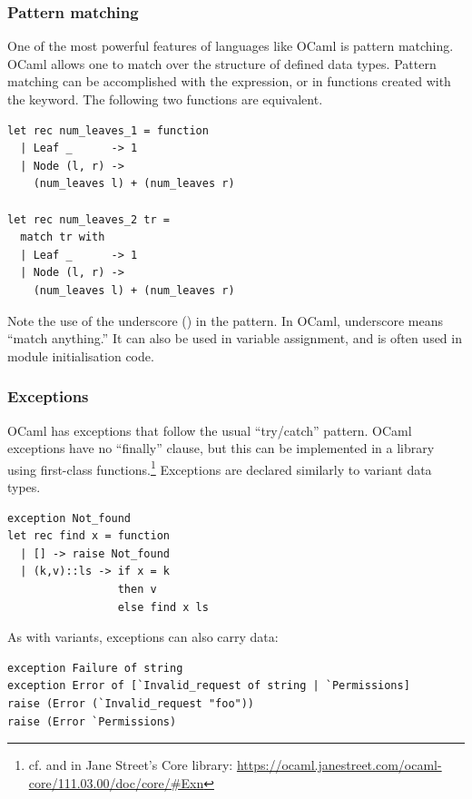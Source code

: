 \subsubsection{Pattern matching}

One of the most powerful features of languages like OCaml is pattern
matching. OCaml allows one to match over the structure of defined data
types. Pattern matching can be accomplished with the
expression, or in functions created with the 
keyword. The following two functions are equivalent.

\begin{lstlisting}
let rec num_leaves_1 = function
  | Leaf _      -> 1
  | Node (l, r) ->
    (num_leaves l) + (num_leaves r)

let rec num_leaves_2 tr =
  match tr with
  | Leaf _      -> 1
  | Node (l, r) ->
    (num_leaves l) + (num_leaves r)
\end{lstlisting}

Note the use of the underscore (\code{_}) in the 
pattern. In OCaml, underscore means ``match anything.'' It can also be
used in variable assignment, and is often used in module
initialisation code.

\subsubsection{Exceptions}

OCaml has exceptions that follow the usual ``try/catch''
pattern. OCaml exceptions have no ``finally'' clause, but this can be
implemented in a library using first-class
functions.\footnote{cf.  and  in Jane
  Street's Core library:
  \url{https://ocaml.janestreet.com/ocaml-core/111.03.00/doc/core/#Exn}}
Exceptions are declared similarly to variant data types.

\begin{lstlisting}
exception Not_found
let rec find x = function
  | [] -> raise Not_found
  | (k,v)::ls -> if x = k
                 then v
                 else find x ls
\end{lstlisting}

As with variants, exceptions can also carry data:

\begin{lstlisting}
exception Failure of string
exception Error of [`Invalid_request of string | `Permissions]
raise (Error (`Invalid_request "foo"))
raise (Error `Permissions)
\end{lstlisting}

